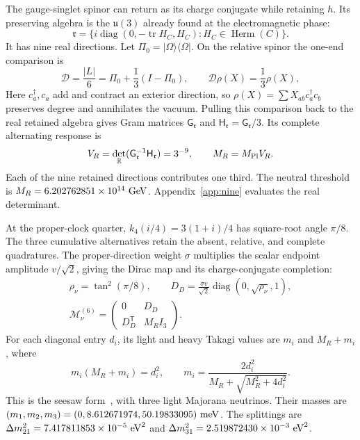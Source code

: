 \documentclass[aps,prx,reprint,longbibliography]{revtex4-2}
\providecommand{\tr}{\operatorname{tr}}
\providecommand{\diag}{\operatorname{diag}}
\providecommand{\Herm}{\operatorname{Herm}}
\begin{document}
The gauge-singlet spinor can return as its charge conjugate while retaining $h$. Its preserving algebra is the $\mathfrak u(3)$ already found at the electromagnetic phase:
\begin{equation}
 \mathfrak r=\{i\diag(0,-\tr H_C,H_C):H_C\in\Herm(C)\}.
 \label{eq:neutral_retained}
\end{equation}
It has nine real directions. Let $\Pi_0=|\Omega\rangle\langle\Omega|$. On the relative spinor the one-end comparison is
\begin{equation}
 \mathcal D=\frac{|L|}{6}=\Pi_0+\frac13(I-\Pi_0),\qquad
 \mathcal D\rho(X)=\frac13\rho(X),
 \label{eq:neutral_response}
\end{equation}
Here $c_a^\dagger,c_a$ add and contract an exterior direction, so $\rho(X)=\sum X_{ab}c_a^\dagger c_b$ preserves degree and annihilates the vacuum. Pulling this comparison back to the real retained algebra gives Gram matrices $\mathsf G_{\mathfrak r}$ and $\mathsf H_{\mathfrak r}=\mathsf G_{\mathfrak r}/3$. Its complete alternating response is
\begin{equation}
 V_R=\det_{\mathbb R}(\mathsf G_{\mathfrak r}^{-1}\mathsf H_{\mathfrak r})=3^{-9},
 \qquad M_R=M_{\rm Pl}V_R.
 \label{eq:neutral_scales}
\end{equation}
Each of the nine retained directions contributes one third. The neutral threshold is $M_R=6.202762851\times10^{14}\ {\rm GeV}$. Appendix~\ref{app:nine} evaluates the real determinant.

At the proper-clock quarter, $k_4(i/4)=3(1+i)/4$ has square-root angle $\pi/8$. The three cumulative alternatives retain the absent, relative, and complete quadratures. The proper-direction weight $\sigma$ multiplies the scalar endpoint amplitude $v/\sqrt2$, giving the Dirac map and its charge-conjugate completion:
\begin{equation}
 \begin{gathered}
 \rho_\nu=\tan^2(\pi/8),\qquad
 D_D=\frac{\sigma v}{\sqrt2}\diag(0,\sqrt{\rho_\nu},1),\\
 \mathcal M_\nu^{(6)}=\begin{pmatrix}0&D_D\\D_D^{\mathsf T}&M_RI_3\end{pmatrix}.
 \end{gathered}
 \label{eq:neutrino_matrix}
\end{equation}
For each diagonal entry $d_i$, its light and heavy Takagi values are $m_i$ and $M_R+m_i$, where
\begin{equation}
 m_i(M_R+m_i)=d_i^2,\qquad
 m_i=\frac{2d_i^2}{M_R+\sqrt{M_R^2+4d_i^2}}.
 \label{eq:neutrino_roots}
\end{equation}
This is the seesaw form~\cite{Seesaw}, with three light Majorana neutrinos. Their masses are $(m_1,m_2,m_3)=(0,8.612671974,50.19833095)\ {\rm meV}$. The splittings are $\Delta m_{21}^2=7.417811853\times10^{-5}\ {\rm eV}^2$ and $\Delta m_{31}^2=2.519872430\times10^{-3}\ {\rm eV}^2$.
\end{document}
